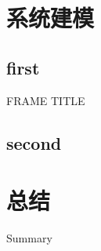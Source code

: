 \documentclass[CJKchecksingle]{beamer}
\begin{document}
\section{系统建模}
\subsection{first}
\begin{frame}{FRAME TITLE}
\end{frame}
\subsection{second}


\section*{总结}

\begin{frame}{Summary}
\end{frame}

%
%
%  
%  
%
\end{document}
